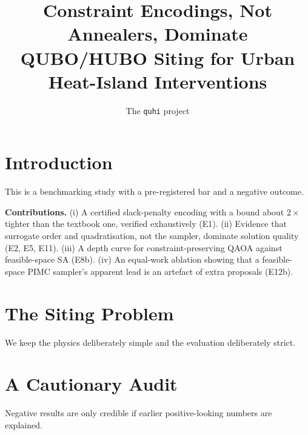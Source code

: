 \documentclass[runningheads]{llncs}
\begin{document}
\title{Constraint Encodings, Not Annealers, Dominate QUBO/HUBO Siting for Urban Heat-Island Interventions}
\author{The \texttt{quhi} project}
\maketitle

\begin{abstract}

\end{abstract}

\section{Introduction}\label{sec:intro}
This is a benchmarking study with a pre-registered bar and a negative outcome.


\noindent\textbf{Contributions.} (i) A certified slack-penalty encoding with a bound about
$2\times$ tighter than the textbook one, verified exhaustively (E1). (ii) Evidence that surrogate
order and quadratisation, not the sampler, dominate solution quality (E2, E5, E11). (iii) A
depth curve for constraint-preserving QAOA against feasible-space SA (E8b). (iv) An equal-work
ablation showing that a feasible-space PIMC sampler's apparent lead is an artefact of extra
proposals (E12b).

\section{The Siting Problem}\label{sec:problem}
We keep the physics deliberately simple and the evaluation deliberately strict.


\section{A Cautionary Audit}\label{sec:audit}
Negative results are only credible if earlier positive-looking numbers are explained.

\end{document}
